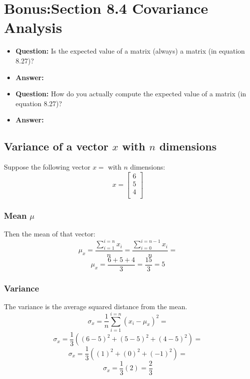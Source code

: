 \newpage
\section{Bonus:Section 8.4 Covariance Analysis}


\begin{itemize}
    \item \textbf{Question:} Is the expected value of a matrix (always) a matrix (in equation 8.27)?
    \item \textbf{Answer:}
\end{itemize}

\begin{itemize}
    \item \textbf{Question:} How do you actually compute the expected value of a matrix (in equation 8.27)?
    \item \textbf{Answer:}
\end{itemize}

\subsection{Variance of a vector $x$ with $n$ dimensions}
Suppose the following vector $x=$ with $n$ dimensions:
\begin{equation}
x=
    \begin{bmatrix}
    6\\
    5\\
    4\\
    \end{bmatrix}
\end{equation}
\subsubsection{Mean $\mu$}
Then the mean of that vector:
\begin{equation}
    \mu_x =\frac{\sum_{i=1}^{i=n}{x_i}}{n}= \frac{\sum_{i=0}^{i=n-1}{x_i}}{n}=
\end{equation}
\begin{equation}
    \mu_x=\frac{6+5+4}{3}=\frac{15}{3}=5
\end{equation}
\subsubsection{Variance}
The variance is the average squared distance from the mean.
\begin{equation}
    \sigma_x=\frac{1}{n}\sum_{i=1}^{i=n}{({x_i}-\mu_x)}^2=
\end{equation}
\begin{equation}
    \sigma_x=\frac{1}{3}({(6-5)}^2+{(5-5)}^2+{(4-5)}^2)=
\end{equation}
\begin{equation}
    \sigma_x=\frac{1}{3}({(1)}^2+{(0)}^2+{(-1)}^2)=
\end{equation}
\begin{equation}
    \sigma_x=\frac{1}{3}(2)=\frac{2}{3}
\end{equation}

